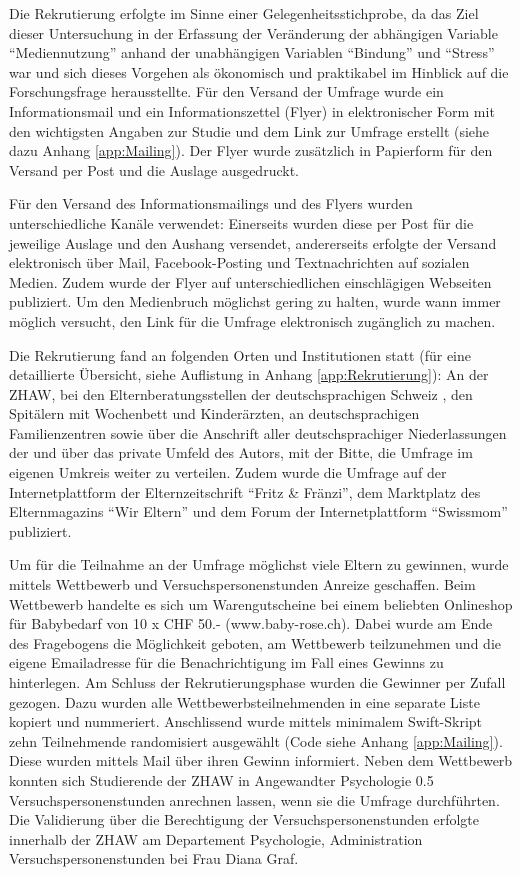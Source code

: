 Die Rekrutierung erfolgte im Sinne einer Gelegenheitsstichprobe, da das Ziel dieser Untersuchung in der Erfassung der Veränderung der abhängigen Variable \enquote{Mediennutzung} anhand der unabhängigen Variablen \enquote{Bindung} und \enquote{Stress} war und sich dieses Vorgehen als ökonomisch und praktikabel \cite{TUDresden2015} im Hinblick auf die Forschungsfrage herausstellte. Für den Versand der Umfrage wurde ein Informationsmail und ein Informationszettel (Flyer) in elektronischer Form mit den wichtigsten Angaben zur Studie und dem Link zur Umfrage erstellt (siehe dazu Anhang \ref{app:Mailing}). Der Flyer wurde zusätzlich in Papierform für den Versand per Post und die Auslage ausgedruckt. 

Für den Versand des Informationsmailings und des Flyers wurden unterschiedliche Kanäle verwendet: Einerseits wurden diese per Post für die jeweilige Auslage und den Aushang versendet, andererseits erfolgte der Versand elektronisch über Mail, Facebook-Posting und Textnachrichten auf sozialen Medien. Zudem wurde der Flyer auf unterschiedlichen einschlägigen Webseiten publiziert. Um den Medienbruch möglichst gering zu halten, wurde wann immer möglich versucht, den Link für die Umfrage elektronisch zugänglich zu machen. 

Die Rekrutierung fand an folgenden Orten und Institutionen statt (für eine detaillierte Übersicht, siehe Auflistung in Anhang \ref{app:Rekrutierung}): An der ZHAW, bei den Elternberatungsstellen der deutschsprachigen Schweiz \cite{Sfmvb2018}, den Spitälern mit Wochenbett und Kinderärzten, an deutschsprachigen Familienzentren \cite{NetzwerkBildung2018} sowie über die Anschrift aller deutschsprachiger Niederlassungen der  und über das private Umfeld des Autors, mit der Bitte, die Umfrage im eigenen Umkreis weiter zu verteilen. Zudem wurde die Umfrage auf der Internetplattform der Elternzeitschrift \enquote{Fritz \&  Fränzi}, dem Marktplatz des Elternmagazins \enquote{Wir Eltern} und dem Forum der Internetplattform \enquote{Swissmom} publiziert.

Um für die Teilnahme an der Umfrage möglichst viele Eltern zu gewinnen, wurde mittels Wettbewerb und Versuchspersonenstunden Anreize geschaffen. Beim Wettbewerb handelte es sich um Warengutscheine bei einem beliebten Onlineshop für Babybedarf von 10 x CHF 50.- (www.baby-rose.ch). Dabei wurde am Ende des Fragebogens die Möglichkeit geboten, am Wettbewerb teilzunehmen und die eigene Emailadresse für die Benachrichtigung im Fall eines Gewinns zu hinterlegen. Am Schluss der Rekrutierungsphase wurden die Gewinner per Zufall gezogen. Dazu wurden alle Wettbewerbsteilnehmenden in eine separate Liste kopiert und nummeriert. Anschlissend wurde mittels minimalem Swift-Skript \cite{Swift2017} zehn Teilnehmende randomisiert ausgewählt (Code siehe Anhang \ref{app:Mailing}). Diese wurden mittels Mail über ihren Gewinn informiert. Neben dem Wettbewerb konnten sich Studierende der ZHAW in Angewandter Psychologie 0.5 Versuchspersonenstunden anrechnen lassen, wenn sie die Umfrage durchführten. Die Validierung über die Berechtigung der Versuchspersonenstunden erfolgte innerhalb der ZHAW am Departement Psychologie,  Administration Versuchspersonenstunden bei Frau Diana Graf. 


